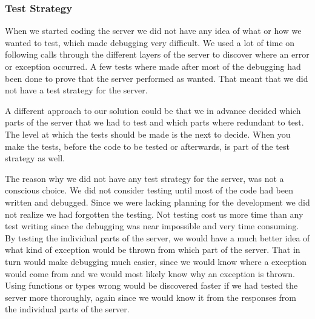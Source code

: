\subsubsection{Test Strategy}
When we started coding the server we did not have any idea of what or how we wanted to test, which made debugging very difficult.
We used a lot of time on following calls through the different layers of the server to discover where an error or exception occurred.
A few tests where made after most of the debugging had been done to prove that the server performed as wanted.
That meant that we did not have a test strategy for the server.

A different approach to our solution could be that we in advance decided which parts of the server that we had to test and which parts where redundant to test.
The level at which the tests should be made is the next to decide.
When you make the tests, before the code to be tested or afterwards, is part of the test strategy as well.

The reason why we did not have any test strategy for the server, was not a conscious choice.
We did not consider testing until most of the code had been written and debugged.
Since we were lacking planning for the development we did not realize we had forgotten the testing.
Not testing cost us more time than any test writing since the debugging was near impossible and very time consuming.
By testing the individual parts of the server, we would have a much better idea of what kind of exception would be thrown from which part of the server.
That in turn would make debugging much easier, since we would know where a exception would come from and we would most likely know why an exception is thrown.
Using functions or types wrong would be discovered faster if we had tested the server more thoroughly, again since we would know it from the responses from the individual parts of the server. 